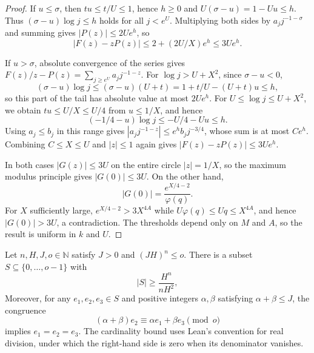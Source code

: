 \begin{proof}
If $u\le\sigma$, then $t u\le t/U\le1$, hence $h\ge0$ and
$U(\sigma-u)=1-Uu\le h$. Thus $(\sigma-u)\log j\le h$ holds for all $j<e^U$. Multiplying both sides by $a_j j^{-1-\sigma}$ and summing gives $|P(z)|\le2Ue^h$, so
\[
 |F(z)-zP(z)|\le 2+(2U/X)e^h\le3Ue^h.
\]

If $u>\sigma$, absolute convergence of the series gives
$F(z)/z-P(z)=\sum_{j\ge e^U}a_j j^{-1-z}$. For $\log j>U+X^2$, since $\sigma-u<0$,
\[
 (\sigma-u)\log j\le(\sigma-u)(U+t)
 =1+t/U-(U+t)u\le h,
\]
so this part of the tail has absolute value at most $2Ue^h$. For $U\le\log j\le U+X^2$, we obtain $tu\le U/X\le U/4$ from $u\le1/X$, and hence
\[
 (-1/4-u)\log j\le -U/4-Uu\le h.
\]
Using $a_j\le b_j$ in this range gives $|a_j j^{-1-z}|\le e^h b_jj^{-3/4}$, whose sum is at most $Ce^h$.
Combining $C\le X\le U$ and $|z|\le1$ again gives $|F(z)-zP(z)|\le3Ue^h$.

In both cases $|G(z)|\le3U$ on the entire circle $|z|=1/X$, so the maximum modulus principle gives $|G(0)|\le3U$. On the other hand,
\[
 |G(0)|=\frac{e^{X/4-2}}{\varphi(q)}.
\]
For $X$ sufficiently large, $e^{X/4-2}>3X^{4A}$ while $U\varphi(q)\le Uq\le X^{4A}$, and hence $|G(0)|>3U$, a contradiction. The thresholds depend only on $M$ and $A$, so the result is uniform in $k$ and $U$.
\end{proof}

\begin{lemma}
\label{lem:behrend-exponents}
\emitthmsource
Let $n,H,J,o\in\mathbb N$ satisfy $J>0$ and $(JH)^n\le o$. There is a subset $S\subseteq\{0,\ldots,o-1\}$ with
\[
 |S|\ge\frac{H^n}{nH^2},
\]
Moreover, for any $e_1,e_2,e_3\in S$ and positive integers $\alpha,\beta$ satisfying $\alpha+\beta\le J$, the congruence
\[
 (\alpha+\beta)e_2\equiv\alpha e_1+\beta e_3\pmod o
\]
implies $e_1=e_2=e_3$. The cardinality bound uses Lean's convention for real division, under which the right-hand side is zero when its denominator vanishes.
\end{lemma}


